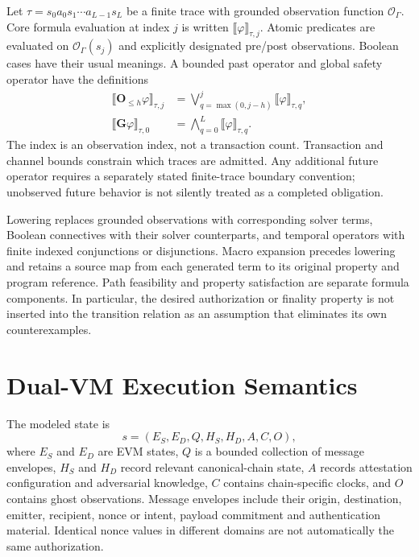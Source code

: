 \documentclass[journal]{IEEEtran}
\theoremstyle{definition}
\begin{document}
Let $\tau=s_0a_0s_1\cdots a_{L-1}s_L$ be a finite trace with grounded observation function $\mathcal O_\Gamma$. Core formula evaluation at index $j$ is written $\llbracket\varphi\rrbracket_{\tau,j}$. Atomic predicates are evaluated on $\mathcal O_\Gamma(s_j)$ and explicitly designated pre/post observations. Boolean cases have their usual meanings. A bounded past operator and global safety operator have the definitions
\begin{align}
\llbracket\mathbf O_{\le h}\varphi\rrbracket_{\tau,j}
 &=\bigvee_{q=\max(0,j-h)}^j\llbracket\varphi\rrbracket_{\tau,q},\\
\llbracket\mathbf G\varphi\rrbracket_{\tau,0}
 &=\bigwedge_{q=0}^{L}\llbracket\varphi\rrbracket_{\tau,q}.
\end{align}
The index is an observation index, not a transaction count. Transaction and channel bounds constrain which traces are admitted. Any additional future operator requires a separately stated finite-trace boundary convention; unobserved future behavior is not silently treated as a completed obligation.

Lowering replaces grounded observations with corresponding solver terms, Boolean connectives with their solver counterparts, and temporal operators with finite indexed conjunctions or disjunctions. Macro expansion precedes lowering and retains a source map from each generated term to its original property and program reference. Path feasibility and property satisfaction are separate formula components. In particular, the desired authorization or finality property is not inserted into the transition relation as an assumption that eliminates its own counterexamples.

\section{Dual-VM Execution Semantics}
\label{sec:dual-vm-v2}

The modeled state is
\[
s=(E_S,E_D,Q,H_S,H_D,A,C,O),
\]
where $E_S$ and $E_D$ are EVM states, $Q$ is a bounded collection of message envelopes, $H_S$ and $H_D$ record relevant canonical-chain state, $A$ records attestation configuration and adversarial knowledge, $C$ contains chain-specific clocks, and $O$ contains ghost observations. Message envelopes include their origin, destination, emitter, recipient, nonce or intent, payload commitment and authentication material. Identical nonce values in different domains are not automatically the same authorization.
\end{document}
